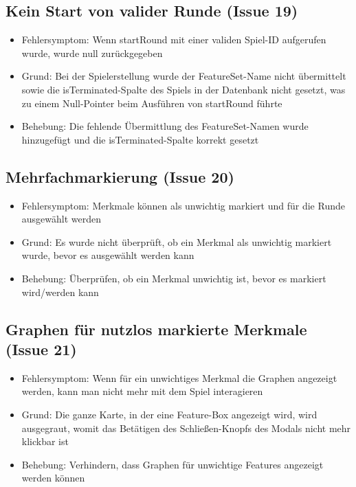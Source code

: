 \documentclass[a4paper]{scrreprt}
\begin{document}
    \subsection{Kein Start von valider Runde (Issue 19)}
    \begin{itemize}
        \item Fehlersymptom: Wenn startRound mit einer validen Spiel-ID aufgerufen wurde, wurde null zurückgegeben
        \item Grund: Bei der Spielerstellung wurde der FeatureSet-Name nicht übermittelt sowie die isTerminated-Spalte des Spiels
        in der Datenbank nicht gesetzt, was zu einem Null-Pointer beim Ausführen von startRound führte
        \item Behebung: Die fehlende Übermittlung des FeatureSet-Namen wurde hinzugefügt und die isTerminated-Spalte korrekt gesetzt
    \end{itemize}

    \subsection{Mehrfachmarkierung (Issue 20)}
    \begin{itemize}
        \item Fehlersymptom: Merkmale können als unwichtig markiert und für die Runde ausgewählt werden
        \item Grund: Es wurde nicht überprüft, ob ein Merkmal als unwichtig markiert wurde, bevor es ausgewählt werden kann
        \item Behebung: Überprüfen, ob ein Merkmal unwichtig ist, bevor es markiert wird/werden kann
    \end{itemize}

    \subsection{Graphen für nutzlos markierte Merkmale (Issue 21)}
    \begin{itemize}
        \item Fehlersymptom: Wenn für ein unwichtiges Merkmal die Graphen angezeigt werden, kann man nicht mehr mit dem Spiel interagieren
        \item Grund: Die ganze Karte, in der eine Feature-Box angezeigt wird, wird ausgegraut, womit das Betätigen des Schließen-Knopfs des Modals nicht mehr klickbar ist
        \item Behebung: Verhindern, dass Graphen für unwichtige Features angezeigt werden können
    \end{itemize}
\end{document}
